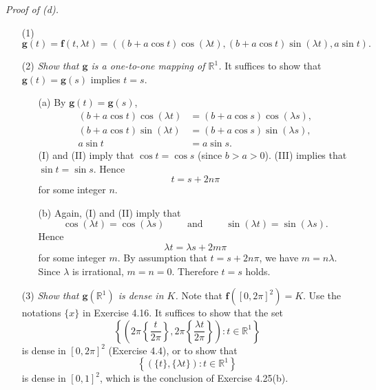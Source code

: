 \documentclass{article}
\begin{document}
\emph{Proof of (d).}
\begin{enumerate}
\item[(1)]
  \[
    \mathbf{g}(t)
    = \mathbf{f}(t,\lambda t)
    = ( (b+a\cos t)\cos(\lambda t), (b+a\cos t)\sin(\lambda t), a\sin t ).
  \]

\item[(2)]
  \emph{Show that $\mathbf{g}$ is a one-to-one mapping of $\mathbb{R}^1$.}
  It suffices to show that $\mathbf{g}(t) = \mathbf{g}(s)$ implies $t = s$.

  \begin{enumerate}
  \item[(a)]
    By $\mathbf{g}(t) = \mathbf{g}(s)$,
    \begin{align*}
      (b+a\cos t)\cos(\lambda t) &= (b+a\cos s)\cos(\lambda s) \tag{I}, \\
      (b+a\cos t)\sin(\lambda t) &= (b+a\cos s)\sin(\lambda s) \tag{II}, \\
      a\sin t &= a\sin s \tag{III}.
    \end{align*}
    (I) and (II) imply that $\cos t = \cos s$ (since $b > a > 0$).
    (III) implies that $\sin t = \sin s$.
    Hence
    \[
      t = s+2n\pi
    \]
    for some integer $n$.

  \item[(b)]
    Again, (I) and (II) imply that
    \[
      \cos(\lambda t) = \cos(\lambda s)
      \qquad \text{ and } \qquad
      \sin(\lambda t) = \sin(\lambda s).
    \]
    Hence
    \[
      \lambda t = \lambda s + 2m\pi
    \]
    for some integer $m$.
    By assumption that $t = s+2n\pi$, we have $m = n \lambda$.
    Since $\lambda$ is irrational, $m = n = 0$.
    Therefore $t = s$ holds.
  \end{enumerate}

\item[(3)]
  \emph{Show that $\mathbf{g}(\mathbb{R}^1)$ is dense in $K$.}
  Note that $\mathbf{f}\left([0,2\pi]^2\right) = K$.
  Use the notations $\{x\}$ in Exercise 4.16.
  It suffices to show that the set
  \[
    \left\{ \left(
      2\pi\left\{\frac{t}{2\pi}\right\},
      2\pi\left\{\frac{\lambda t}{2\pi}\right\}
    \right) : t \in \mathbb{R}^1 \right\}
  \]
  is dense in $[0,2\pi]^2$ (Exercise 4.4),
  or to show that
  \[
    \left\{ \left(\{ t \}, \{ \lambda t \} \right) : t \in \mathbb{R}^1 \right\}
  \]
  is dense in $[0,1]^2$, which is the conclusion of Exercise 4.25(b).


\end{enumerate}
\end{document}
